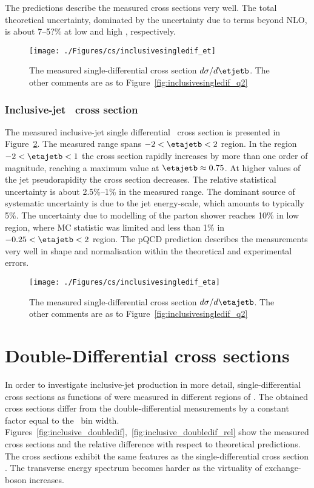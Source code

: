 The predictions describe the measured cross sections very well. The total theoretical uncertainty, dominated by the uncertainty due to terms beyond NLO, is about 7--5?\% at low and high \etjetb, respectively. 
\begin{figure}[p]
	\centering
		\texttt{[image: ./Figures/cs/inclusivesingledif\_et]}
	\caption{The measured single-differential cross section $d\sigma/d\etjetb$. The other comments are as to Figure~\ref{fig:inclusivesingledif_q2}}
	\label{fig:inclusivesingledif_et}
\end{figure}

\subsubsection*{Inclusive-jet \dsdetajetb~cross section}
The measured inclusive-jet single differential \dsdetajetb~cross section is presented in Figure~\ref{fig:inclusivesingledif_eta}. The measured range spans $-2 < \etajetb < 2$ region. In the region  $-2 < \etajetb < 1$ the cross section rapidly increases by more than one order of magnitude, reaching a maximum value at $\etajetb \approx 0.75$. At higher values of the jet pseudorapidity the cross section decreases. The relative statistical uncertainty is about 2.5\%--1\% in the measured range. The dominant source of systematic uncertainty is due to the jet energy-scale, which amounts to typically 5\%. The uncertainty due to modelling of the parton shower reaches 10\% in low \etajetb region, where MC statistic was limited and less than 1\% in $-0.25 < \etajetb < 2$ region. The pQCD prediction describes the measurements very well in shape and normalisation within the theoretical and experimental errors.
\begin{figure}[p]
	\centering
		\texttt{[image: ./Figures/cs/inclusivesingledif\_eta]}
	\caption{The measured single-differential cross section $d\sigma/d\etajetb$. The other comments are as to Figure~\ref{fig:inclusivesingledif_q2}}
	\label{fig:inclusivesingledif_eta}
\end{figure}

\section{Double-Differential cross sections}
In order to investigate inclusive-jet production in more detail, single-differential cross sections as functions of \etjetb were measured in different regions of \qsq. The obtained cross sections differ from the double-differential measurements by a constant factor equal to the \qsq~bin width. Figures~\ref{fig:inclusive_doubledif},~\ref{fig:inclusive_doubledif_rel} show the measured cross sections and the relative difference with respect to theoretical predictions. The cross sections exhibit the same features as the single-differential cross section \dsdetjetb. The transverse energy spectrum becomes harder as the virtuality of exchange-boson increases.

